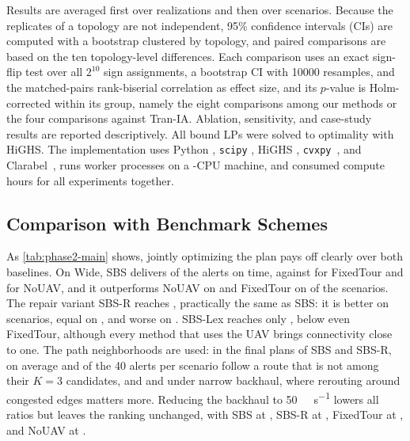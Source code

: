 Results are averaged first over realizations and then over scenarios. Because the replicates of a topology are not independent, 95\% confidence intervals (CIs) are computed with a bootstrap clustered by topology, and paired comparisons are based on the ten topology-level differences. Each comparison uses an exact sign-flip test over all $2^{10}$ sign assignments, a bootstrap CI with \num{10000} resamples, and the matched-pairs rank-biserial correlation as effect size, and its $p$-value is Holm-corrected within its group, namely the eight comparisons among our methods or the four comparisons against Tran-IA. Ablation, sensitivity, and case-study results are reported descriptively. All bound LPs were solved to optimality with HiGHS. The implementation uses Python \ResultPythonVersion, \texttt{scipy} \ResultScipyVersion, HiGHS \ResultHighsVersion, \texttt{cvxpy}~\ResultExtCvxpyVersion, and Clarabel~\ResultExtClarabelVersion, runs \ResultWorkers{} worker processes on a \ResultCpuCount-CPU machine, and consumed \ResultExtComputeHours{} compute hours for all experiments together.

\subsection{Comparison with Benchmark Schemes}
\label{sec:results-main}



As \cref{tab:phase2-main} shows, jointly optimizing the plan pays off clearly over both baselines. On Wide, SBS delivers \ResultTwoTimelyVzeroBtwo{} of the alerts on time, against \ResultTwoTimelyVzeroBone{} for FixedTour and \ResultTwoTimelyVzeroBzero{} for NoUAV, and it outperforms NoUAV on \ResultTwoHigherVzeroBtwoBzero{} and FixedTour on \ResultTwoHigherVzeroBtwoBone{} of the \ResultTwoScenarioCount{} scenarios. The repair variant SBS-R reaches \ResultTwoTimelyVzeroP, practically the same as SBS: it is better on \ResultTwoHigherVzeroPBtwo{} scenarios, equal on \ResultTwoEqualVzeroPBtwo{}, and worse on \ResultTwoLowerVzeroPBtwo. SBS-Lex reaches only \ResultTwoTimelyVzeroBthree, below even FixedTour, although every method that uses the UAV brings connectivity close to one. The path neighborhoods are used: in the final plans of SBS and SBS-R, on average \ResultTwoOutsideVzeroBtwo{} and \ResultTwoOutsideVzeroP{} of the 40 alerts per scenario follow a route that is not among their $K=3$ candidates, and \ResultTwoOutsideVzeroBhfivezeroBtwo{} and \ResultTwoOutsideVzeroBhfivezeroP{} under narrow backhaul, where rerouting around congested edges matters more. Reducing the backhaul to \qty{50}{\kilo\bit\per\second} lowers all ratios but leaves the ranking unchanged, with SBS at \ResultTwoTimelyVzeroBhfivezeroBtwo, SBS-R at \ResultTwoTimelyVzeroBhfivezeroP, FixedTour at \ResultTwoTimelyVzeroBhfivezeroBone, and NoUAV at \ResultTwoTimelyVzeroBhfivezeroBzero.

